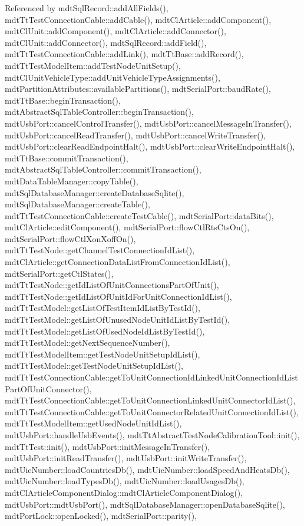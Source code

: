 Referenced by mdt\-Sql\-Record\-::add\-All\-Fields(), mdt\-Tt\-Test\-Connection\-Cable\-::add\-Cable(), mdt\-Cl\-Article\-::add\-Component(), mdt\-Cl\-Unit\-::add\-Component(), mdt\-Cl\-Article\-::add\-Connector(), mdt\-Cl\-Unit\-::add\-Connector(), mdt\-Sql\-Record\-::add\-Field(), mdt\-Tt\-Test\-Connection\-Cable\-::add\-Link(), mdt\-Tt\-Base\-::add\-Record(), mdt\-Tt\-Test\-Model\-Item\-::add\-Test\-Node\-Unit\-Setup(), mdt\-Cl\-Unit\-Vehicle\-Type\-::add\-Unit\-Vehicle\-Type\-Assignments(), mdt\-Partition\-Attributes\-::available\-Partitions(), mdt\-Serial\-Port\-::baud\-Rate(), mdt\-Tt\-Base\-::begin\-Transaction(), mdt\-Abstract\-Sql\-Table\-Controller\-::begin\-Transaction(), mdt\-Usb\-Port\-::cancel\-Control\-Transfer(), mdt\-Usb\-Port\-::cancel\-Message\-In\-Transfer(), mdt\-Usb\-Port\-::cancel\-Read\-Transfer(), mdt\-Usb\-Port\-::cancel\-Write\-Transfer(), mdt\-Usb\-Port\-::clear\-Read\-Endpoint\-Halt(), mdt\-Usb\-Port\-::clear\-Write\-Endpoint\-Halt(), mdt\-Tt\-Base\-::commit\-Transaction(), mdt\-Abstract\-Sql\-Table\-Controller\-::commit\-Transaction(), mdt\-Data\-Table\-Manager\-::copy\-Table(), mdt\-Sql\-Database\-Manager\-::create\-Database\-Sqlite(), mdt\-Sql\-Database\-Manager\-::create\-Table(), mdt\-Tt\-Test\-Connection\-Cable\-::create\-Test\-Cable(), mdt\-Serial\-Port\-::data\-Bits(), mdt\-Cl\-Article\-::edit\-Component(), mdt\-Serial\-Port\-::flow\-Ctl\-Rts\-Cts\-On(), mdt\-Serial\-Port\-::flow\-Ctl\-Xon\-Xoff\-On(), mdt\-Tt\-Test\-Node\-::get\-Channel\-Test\-Connection\-Id\-List(), mdt\-Cl\-Article\-::get\-Connection\-Data\-List\-From\-Connection\-Id\-List(), mdt\-Serial\-Port\-::get\-Ctl\-States(), mdt\-Tt\-Test\-Node\-::get\-Id\-List\-Of\-Unit\-Connections\-Part\-Of\-Unit(), mdt\-Tt\-Test\-Node\-::get\-Id\-List\-Of\-Unit\-Id\-For\-Unit\-Connection\-Id\-List(), mdt\-Tt\-Test\-Model\-::get\-List\-Of\-Test\-Item\-Id\-List\-By\-Test\-Id(), mdt\-Tt\-Test\-Model\-::get\-List\-Of\-Unused\-Node\-Unit\-Id\-List\-By\-Test\-Id(), mdt\-Tt\-Test\-Model\-::get\-List\-Of\-Used\-Node\-Id\-List\-By\-Test\-Id(), mdt\-Tt\-Test\-Model\-::get\-Next\-Sequence\-Number(), mdt\-Tt\-Test\-Model\-Item\-::get\-Test\-Node\-Unit\-Setup\-Id\-List(), mdt\-Tt\-Test\-Model\-::get\-Test\-Node\-Unit\-Setup\-Id\-List(), mdt\-Tt\-Test\-Connection\-Cable\-::get\-To\-Unit\-Connection\-Id\-Linked\-Unit\-Connection\-Id\-List\-Part\-Of\-Unit\-Connector(), mdt\-Tt\-Test\-Connection\-Cable\-::get\-To\-Unit\-Connection\-Linked\-Unit\-Connector\-Id\-List(), mdt\-Tt\-Test\-Connection\-Cable\-::get\-To\-Unit\-Connector\-Related\-Unit\-Connection\-Id\-List(), mdt\-Tt\-Test\-Model\-Item\-::get\-Used\-Node\-Unit\-Id\-List(), mdt\-Usb\-Port\-::handle\-Usb\-Events(), mdt\-Tt\-Abstract\-Test\-Node\-Calibration\-Tool\-::init(), mdt\-Tt\-Test\-::init(), mdt\-Usb\-Port\-::init\-Message\-In\-Transfer(), mdt\-Usb\-Port\-::init\-Read\-Transfer(), mdt\-Usb\-Port\-::init\-Write\-Transfer(), mdt\-Uic\-Number\-::load\-Countries\-Db(), mdt\-Uic\-Number\-::load\-Speed\-And\-Heats\-Db(), mdt\-Uic\-Number\-::load\-Types\-Db(), mdt\-Uic\-Number\-::load\-Usages\-Db(), mdt\-Cl\-Article\-Component\-Dialog\-::mdt\-Cl\-Article\-Component\-Dialog(), mdt\-Usb\-Port\-::mdt\-Usb\-Port(), mdt\-Sql\-Database\-Manager\-::open\-Database\-Sqlite(), mdt\-Port\-Lock\-::open\-Locked(), mdt\-Serial\-Port\-::parity(), 